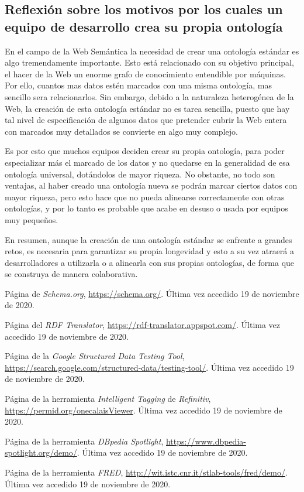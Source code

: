 \documentclass[11pt]{article}
\begin{document}
\subsection{Reflexión sobre los motivos por los cuales un equipo de desarrollo crea su propia ontología}
En el campo de la Web Semántica la necesidad de crear una ontología estándar es algo tremendamente importante. Esto está relacionado con su objetivo principal, el hacer de la Web un enorme grafo de conocimiento entendible por máquinas. Por ello, cuantos mas datos estén marcados con una misma ontología, mas sencillo sera relacionarlos. Sin embargo, debido a la naturaleza heterogénea de la Web, la creación de esta ontología estándar no es tarea sencilla, puesto que hay tal nivel de especificación de algunos datos que pretender cubrir la Web entera con marcados muy detallados se convierte en algo muy complejo.

Es por esto que muchos equipos deciden crear su propia ontología, para poder especializar más el marcado de los datos y no quedarse en la generalidad de esa ontología universal, dotándolos de mayor riqueza. No obstante, no todo son ventajas, al haber creado una ontología nueva se podrán marcar ciertos datos con mayor riqueza, pero esto hace que no pueda alinearse correctamente con otras ontologías, y por lo tanto es probable que acabe en desuso o usada por equipos muy pequeños.

En resumen, aunque la creación de una ontología estándar se enfrente a grandes retos, es necesaria para garantizar su propia longevidad y esto a su vez atraerá a desarrolladores a utilizarla o a alinearla con sus propias ontologías, de forma que se construya de manera colaborativa.
\begin{thebibliography}{8}
Página de \textit{Schema.org}, \url{https://schema.org/}. Última vez accedido 19 de noviembre de 2020.        

Página del \textit{RDF Translator}, \url{https://rdf-translator.appspot.com/}. Última vez accedido 19 de noviembre de 2020.

Página de la \textit{Google Structured Data Testing Tool}, \url{https://search.google.com/structured-data/testing-tool/}. Última vez accedido 19 de noviembre de 2020.

Página de la herramienta \textit{Intelligent Tagging} de \textit{Refinitiv}, \url{https://permid.org/onecalaisViewer}. Última vez accedido 19 de noviembre de 2020.

Página de la herramienta \textit{DBpedia Spotlight}, \url{https://www.dbpedia-spotlight.org/demo/}. Última vez accedido 19 de noviembre de 2020.

Página de la herramienta \textit{FRED}, \url{http://wit.istc.cnr.it/stlab-tools/fred/demo/}. Última vez accedido 19 de noviembre de 2020.
\end{thebibliography}
\end{document}
